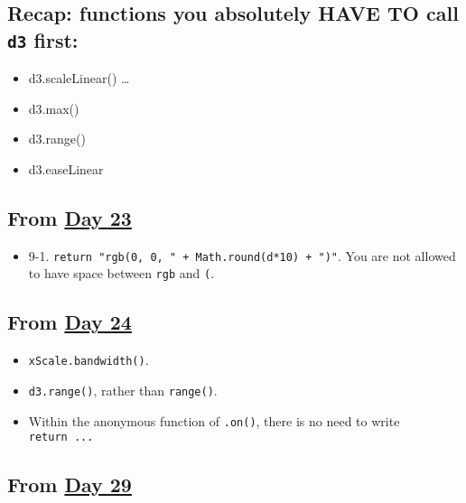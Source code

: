 \documentclass[
]{book}
\providecommand{\tightlist}{%
  \setlength{\itemsep}{0pt}\setlength{\parskip}{0pt}}
\begin{document}
\hypertarget{recap-functions-you-absolutely-have-to-call-d3-first}{%
\subsection{\texorpdfstring{Recap: functions you absolutely HAVE TO call \texttt{d3} first:}{Recap: functions you absolutely HAVE TO call d3 first:}}\label{recap-functions-you-absolutely-have-to-call-d3-first}}

\begin{itemize}
\item
  d3.scaleLinear() \ldots{}
\item
  d3.max()
\item
  d3.range()
\item
  d3.easeLinear
\end{itemize}

\hypertarget{from-day-23-1}{%
\subsection{\texorpdfstring{From \href{https://observablehq.com/@hongtaoh/day-twenty-three-2020-09-16}{Day 23}}{From Day 23}}\label{from-day-23-1}}

\begin{itemize}
\tightlist
\item
  9-1. \texttt{return\ "rgb(0,\ 0,\ "\ +\ Math.round(d*10)\ +\ ")"}. You are not allowed to have space between \texttt{rgb} and \texttt{(}.
\end{itemize}

\hypertarget{from-day-24}{%
\subsection{\texorpdfstring{From \href{https://observablehq.com/@hongtaoh/untitled}{Day 24}}{From Day 24}}\label{from-day-24}}

\begin{itemize}
\item
  \texttt{xScale.bandwidth()}.
\item
  \texttt{d3.range()}, rather than \texttt{range()}.
\item
  Within the anonymous function of \texttt{.on()}, there is no need to write \texttt{return\ ...}
\end{itemize}

\hypertarget{from-day-29-1}{%
\subsection{\texorpdfstring{From \href{https://observablehq.com/@hongtaoh/day-twenty-nine-2020-09-22}{Day 29}}{From Day 29}}\label{from-day-29-1}}
\end{document}
